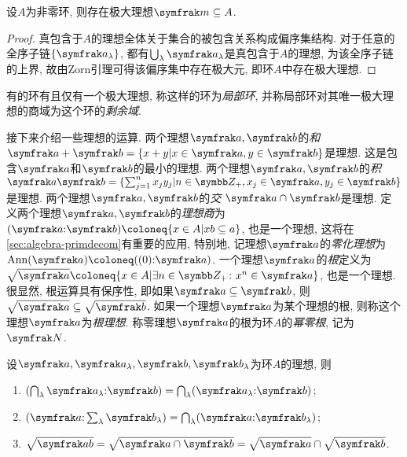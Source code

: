 \begin{theorem}\label{thm:maxideal}
  设$A$为非零环, 则存在极大理想$\ideal{m}\subseteq A$.
\end{theorem}

\begin{proof}
  真包含于$A$的理想全体关于集合的被包含关系构成偏序集结构. 对于任意的全序子链$\{\ideal{a}_\lambda\}$, 都有$\bigcup_{\lambda}\ideal{a}_\lambda$是真包含于$A$的理想, 为该全序子链的上界, 故由Zorn引理可得该偏序集中存在极大元, 即环$A$中存在极大理想.
\end{proof}

有的环有且仅有一个极大理想, 称这样的环为\emph{局部环}, 并称局部环对其唯一极大理想的商域为这个环的\emph{剩余域}.

接下来介绍一些理想的运算. 两个理想$\ideal{a}, \ideal{b}$的\emph{和} $\ideal{a}+\ideal{b}=\{x+y\vert x\in\ideal{a}, y\in\ideal{b}\}$是理想. 这是包含$\ideal{a}$和$\ideal{b}$的最小的理想. 两个理想$\ideal{a}, \ideal{b}$的\emph{积} $\ideal{a}\ideal{b}=\{\sum_{j=1}^n x_jy_j\vert n\in\ZZ_+, x_j\in\ideal{a}, y_j\in\ideal{b}\}$是理想. 两个理想$\ideal{a}, \ideal{b}$的\emph{交} $\ideal{a}\cap\ideal{b}$是理想. 定义两个理想$\ideal{a}, \ideal{b}$的\emph{理想商}为$(\ideal{a}{:}\ideal{b})\coloneq \{x\in A\vert xb\subseteq a\}$, 也是一个理想, 这将在\ref{sec:algebra-primdecom}有重要的应用, 特别地, 记理想$\ideal{a}$的\emph{零化理想}为$\Ann(\ideal{a})\coloneq ((0){:}\ideal{a})$. 一个理想$\ideal{a}$的\emph{根}定义为$\sqrt{\ideal{a}}\coloneq \{x\in A\vert \exists n\in\ZZ_+\colon x^n\in\ideal{a}\}$, 也是一个理想. 很显然, 根运算具有保序性, 即如果$\ideal{a}\subseteq\ideal{b}$, 则$\sqrt{\ideal{a}}\subseteq\sqrt{\ideal{b}}$. 如果一个理想$\ideal{a}$为某个理想的根, 则称这个理想$\ideal{a}$为\emph{根理想}. 称零理想$\ideal{a}$的根为环$A$的\emph{幂零根}, 记为$\nil$.

\begin{proposition}\label{prop:idealop}
  设$\ideal{a}, \ideal{a}_\lambda, \ideal{b}, \ideal{b}_\lambda$为环$A$的理想, 则
  \begin{enumerate}
    \item\label{enum:prop-idealop-quot-firstcap} $(\bigcap_\lambda \ideal{a}_\lambda{:}\ideal{b})=\bigcap_{\lambda}(\ideal{a}_\lambda{:}\ideal{b})$;
    \item $(\ideal{a}{:}\sum_{\lambda}\ideal{b}_\lambda)=\bigcap_{\lambda}(\ideal{a}{:}\ideal{b}_\lambda)$;
    \item\label{enum:prop-idealop-rad-inters} $\sqrt{\ideal{ab}}=\sqrt{\ideal{a}\cap\ideal{b}}=\sqrt{\ideal{a}}\cap\sqrt{\ideal{b}}$.
  \end{enumerate}
\end{proposition}

